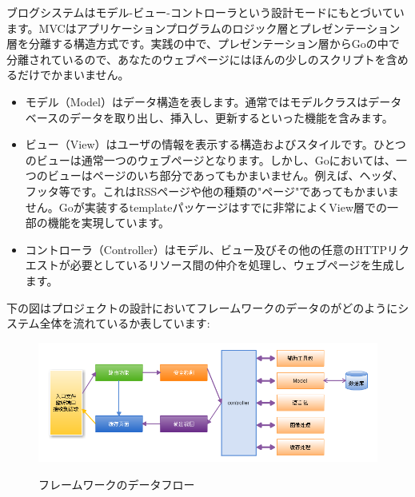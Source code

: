 ブログシステムはモデル-ビュー-コントローラという設計モードにもとづいています。MVCはアプリケーションプログラムのロジック層とプレゼンテーション層を分離する構造方式です。実践の中で、プレゼンテーション層からGoの中で分離されているので、あなたのウェブページにはほんの少しのスクリプトを含めるだけでかまいません。

\begin{itemize}
  \item モデル（Model）はデータ構造を表します。通常ではモデルクラスはデータベースのデータを取り出し、挿入し、更新するといった機能を含みます。
  \item ビュー（View）はユーザの情報を表示する構造およびスタイルです。ひとつのビューは通常一つのウェブページとなります。しかし、Goにおいては、一つのビューはページのいち部分であってもかまいません。例えば、ヘッダ、フッタ等です。これはRSSページや他の種類の"ページ"であってもかまいません。Goが実装するtemplateパッケージはすでに非常によくView層での一部の機能を実現しています。
  \item コントローラ（Controller）はモデル、ビュー及びその他の任意のHTTPリクエストが必要としているリソース間の仲介を処理し、ウェブページを生成します。
\end{itemize}

下の図はプロジェクトの設計においてフレームワークのデータのがどのようにシステム全体を流れているか表しています:

\begin{figure}[H]
   \includegraphics[width=14cm]{13.1.flow.png}
   \label{図13.3}
   \caption{フレームワークのデータフロー}
\end{figure}


